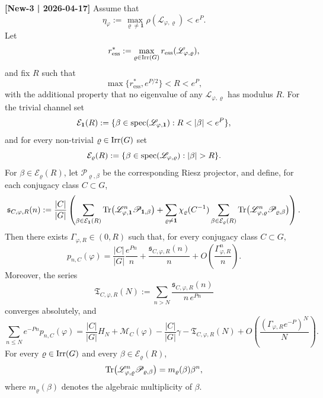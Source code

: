 \begin{theorem}\textbf{[New-3 | 2026-04-17]}
  \label{thm:holder-transfer-spectral-window}
  Assume that
  \[
    \eta_\varphi
    :=
    \max_{\varrho\neq\mathbf 1}\rho(\mathscr L_{\varphi,\varrho})
    <e^P.
  \]
  Let
  \[
    r_{\mathrm{ess}}^\ast
    :=
    \max_{\varrho\in\operatorname{Irr}(G)}
      r_{\mathrm{ess}}(\mathscr L_{\varphi,\varrho}),
  \]
  and fix \(R\) such that
  \[
    \max\{r_{\mathrm{ess}}^\ast,e^{P/2}\}<R<e^P,
  \]
  with the additional property that no eigenvalue of any
  \(\mathscr L_{\varphi,\varrho}\) has modulus \(R\).
  For the trivial channel set
  \[
    \mathcal E_{\mathbf 1}(R)
    :=
    \{\beta\in\spec(\mathscr L_{\varphi,\mathbf 1}):R<|\beta|<e^P\},
  \]
  and for every non-trivial \(\varrho\in\operatorname{Irr}(G)\) set
  \[
    \mathcal E_\varrho(R)
    :=
    \{\beta\in\spec(\mathscr L_{\varphi,\varrho}):|\beta|>R\}.
  \]
  For \(\beta\in\mathcal E_\varrho(R)\), let
  \(\mathscr P_{\varrho,\beta}\) be the corresponding Riesz projector,
  and define, for each conjugacy class \(C\subset G\),
  \begin{equation}\label{eq:holder-transfer-spectral-window-profile}
    \mathfrak s_{C,\varphi,R}(n)
    :=
    \frac{|C|}{|G|}
    \left(
      \sum_{\beta\in\mathcal E_{\mathbf 1}(R)}
        \operatorname{Tr}\bigl(\mathscr L_{\varphi,\mathbf 1}^n
          \mathscr P_{\mathbf 1,\beta}\bigr)
      +
      \sum_{\varrho\neq\mathbf 1}\chi_\varrho(C^{-1})
        \sum_{\beta\in\mathcal E_\varrho(R)}
          \operatorname{Tr}\bigl(\mathscr L_{\varphi,\varrho}^n
            \mathscr P_{\varrho,\beta}\bigr)
    \right).
  \end{equation}
  Then there exists \(\Gamma_{\varphi,R}\in(0,R)\) such that, for every
  conjugacy class \(C\subset G\),
  \begin{equation}\label{eq:holder-transfer-spectral-window-pointwise}
    p_{n,C}(\varphi)
    =
    \frac{|C|}{|G|}\frac{e^{Pn}}{n}
    +\frac{\mathfrak s_{C,\varphi,R}(n)}{n}
    +O\!\left(\frac{\Gamma_{\varphi,R}^n}{n}\right).
  \end{equation}
  Moreover, the series
  \begin{equation}\label{eq:holder-transfer-spectral-window-tail}
    \mathfrak T_{C,\varphi,R}(N)
    :=
    \sum_{n>N}
      \frac{\mathfrak s_{C,\varphi,R}(n)}{n\,e^{Pn}}
  \end{equation}
  converges absolutely, and
  \begin{equation}\label{eq:holder-transfer-spectral-window-harmonic}
    \sum_{n\le N}e^{-Pn}p_{n,C}(\varphi)
    =
    \frac{|C|}{|G|}H_N
    +\mathcal M_C(\varphi)-\frac{|C|}{|G|}\gamma
    -\mathfrak T_{C,\varphi,R}(N)
    +O\!\left(\frac{(\Gamma_{\varphi,R}e^{-P})^N}{N}\right).
  \end{equation}
  For every \(\varrho\in\operatorname{Irr}(G)\) and every
  \(\beta\in\mathcal E_\varrho(R)\),
  \[
    \operatorname{Tr}\bigl(\mathscr L_{\varphi,\varrho}^n\mathscr P_{\varrho,\beta}\bigr)
    =m_\varrho(\beta)\beta^n,
  \]
  where \(m_\varrho(\beta)\) denotes the algebraic multiplicity of
  \(\beta\).
\end{theorem}

